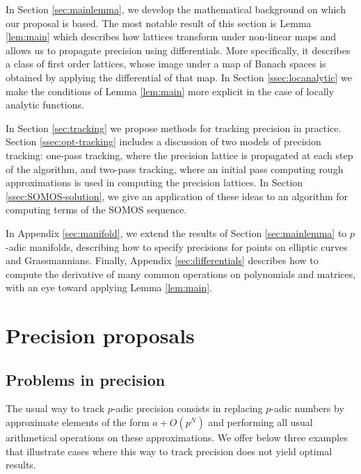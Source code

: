 \documentclass{lms}
\begin{document}
In Section \ref{sec:mainlemma}, we develop the mathematical background on which our proposal is based.
The most notable result of this section is Lemma \ref{lem:main} which describes how lattices transform under non-linear maps and allows us to propagate
precision using differentials.  More specifically, it describes a class of first order lattices,
whose image under a map of Banach spaces is obtained by applying the
differential of that map.  In Section \ref{ssec:locanalytic} we make the conditions
of Lemma \ref{lem:main} more explicit in the case of locally analytic functions.

In Section \ref{sec:tracking} we propose methods for tracking precision in practice.
Section \ref{ssec:opt-tracking} includes a discussion of two models of precision tracking:
one-pass tracking, where the precision lattice is propagated at each step of the algorithm,
and two-pass tracking, where an initial pass computing rough approximations is used
in computing the precision lattices.  In Section \ref{ssec:SOMOS-solution}, we give
an application of these ideas to an algorithm for computing terms of the SOMOS sequence.

In Appendix \ref{sec:manifold}, we extend the results of Section \ref{sec:mainlemma}
to $p$-adic manifolds, describing how to specify precisions for points on elliptic curves
and Grassmannians.  Finally, Appendix \ref{sec:differentials} describes how to compute
the derivative of many common operations on polynomials and matrices, with an eye
toward applying Lemma \ref{lem:main}.

\section{Precision proposals} \label{sec:prec-proposal}

\subsection{Problems in precision}
\label{ssec:stepbystep}

The usual way to track $p$-adic precision consists in replacing $p$-adic 
numbers by approximate elements of the form $a + O(p^N)$ and performing 
all usual arithmetical operations on these approximations.
We offer below three examples that illustrate cases where this way to 
track precision does not yield optimal results.
\end{document}
